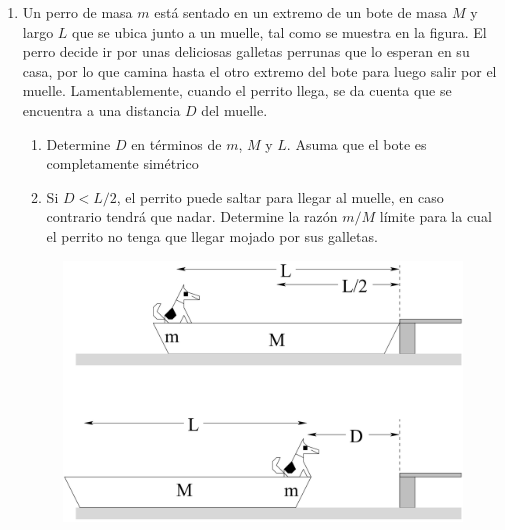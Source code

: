 \documentclass[letterpaper,11pt]{article}
\begin{document}
\begin{enumerate}
\item Un perro de masa $m$ está sentado en un extremo de un bote de masa $M$ y largo $L$ que se ubica junto a un muelle, tal como se muestra en la figura. El perro decide ir por unas deliciosas galletas perrunas que lo esperan en su casa, por lo que camina hasta el otro extremo del bote para luego salir por el muelle. Lamentablemente, cuando el perrito llega, se da cuenta que se encuentra a una distancia $D$ del muelle.

\begin{multicols}{2}
    \begin{enumerate}
        \item Determine $D$ en términos de $m$, $M$ y $L$. Asuma que el bote es completamente simétrico
        
        \item Si $D < L/2$, el perrito puede saltar para llegar al muelle, en caso contrario tendrá que nadar. Determine la razón $m/M$ límite para la cual el perrito no tenga que llegar mojado por sus galletas.
    \end{enumerate}
    
    \columnbreak
    
    \begin{figure}[H]
        \centering
        \includegraphics[width = 0.73\linewidth]{2022-1/img/aux11/perrito.PNG}
    \end{figure}
    
\end{multicols}

\end{enumerate}
\end{document}
